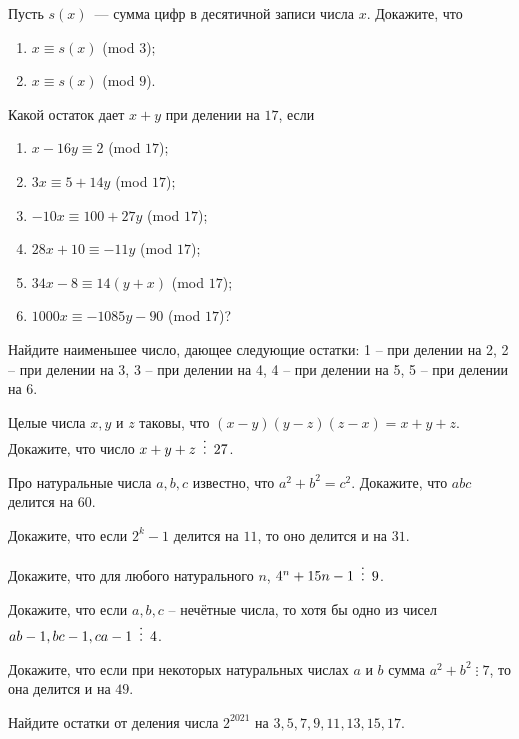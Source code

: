 \documentclass{article}
\begin{document}
\begin{enumerate_boxed}
        \item Пусть $s(x)$~--- сумма цифр в десятичной записи числа $x$.
        Докажите, что
        \begin{enumerate}
            \item $x \equiv s(x)$ (mod $3$);

            \item $x \equiv s(x)$ (mod $9$).
        \end{enumerate}

        \item Какой остаток дает $x + y$ при делении на $17$, если
        \begin{enumerate}
            \item $x-16y\equiv 2$ (mod $17$);

            \item $3x \equiv 5+14y$ (mod $17$);

            \item $-10x \equiv 100+27y$ (mod $17$);

            \item $28x + 10\equiv -11y$ (mod $17$);

            \item $34x - 8\equiv 14(y + x)$ (mod $17$);

            \item $1000x \equiv -1085y - 90$ (mod $17$)?
        \end{enumerate}



        \item Найдите наименьшее число, дающее следующие остатки: 1 – при делении на 2, 2 – при делении на 3, 3 – при делении на 4, 4 – при делении на 5, 5 – при делении на 6.

        \item Целые числа $x, y$ и $z$ таковы, что $(x - y)(y - z)(z - x) = x + y + z$.
        Докажите, что число $x + y + z \,\,\,\vdots\,\,\, 27$.

        \item Про натуральные числа $a, b, c$ известно, что $a^2 + b^2 = c^2$.
        Докажите, что $abc$
        делится на $60$.

        \item Докажите, что если $2^k - 1$ делится на $11$, то оно делится и на $31$.

        \item Докажите, что для любого натурального $n$, $4^n + 15n - 1 \,\,\,\vdots\,\,\, 9$.

        \item Докажите, что если $a, b, c$ – нечётные числа, то хотя бы одно из чисел $ab - 1,  bc - 1,  ca - 1 \,\,\,\vdots\,\,\, 4$.

        \item Докажите, что если при некоторых натуральных числах $a$ и $b$ сумма $a^2 + b^2\; \vdots \; 7$,
        то она делится и на $49$.

        \item Найдите остатки от деления числа $2^{2021}$ на $3, 5, 7, 9, 11, 13, 15, 17$.

    \end{enumerate_boxed}
\end{document}
